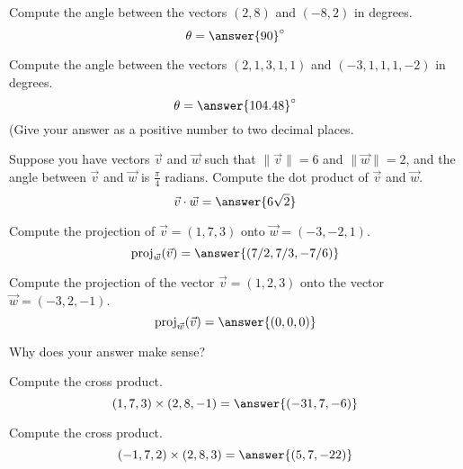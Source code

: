 \documentclass{ximera}
\begin{document}
\begin{problem}
Compute the angle between the vectors $(2,8)$ and $(-8,2)$ in degrees.
\[
\theta = \answer{90}^\circ
\]
\end{problem}

\begin{problem}
Compute the angle between the vectors $(2,1,3,1,1)$ and $(-3,1,1,1,-2)$ in degrees.
\[
\theta = \answer{104.48}^\circ
\]
(Give your answer as a positive number to two decimal places.
\end{problem}

\begin{problem}
Suppose you have vectors $\vec{v}$ and $\vec{w}$ such that $\|\vec{v}\|=6$ and $\|\vec{w}\|=2$, and the angle between $\vec{v}$ and $\vec{w}$ is $\frac{\pi}{4}$ radians. Compute the dot product of $\vec{v}$ and $\vec{w}$.
\[
\vec{v}\cdot \vec{w} = \answer{6\sqrt{2}}
\]
\end{problem}

\begin{problem}
Compute the projection of $\vec{v}=(1,7,3)$ onto $\vec{w}=(-3,-2,1)$.
\[
\textrm{proj}_{\vec{w}}(\vec{v}) = \answer{(7/2,7/3,-7/6)}
\]
\end{problem}

\begin{problem}
Compute the projection of the vector $\vec{v}=(1,2,3)$ onto the vector $\vec{w} = (-3,2,-1)$.
\[
\textrm{proj}_{\vec{w}}(\vec{v}) = \answer{(0,0,0)}
\]
\begin{problem}
Why does your answer make sense?
\begin{multipleChoice}
\end{multipleChoice}
\end{problem}
\end{problem}

\begin{problem}
Compute the cross product.
\[
(1,7,3)\times (2,8,-1) = \answer{(-31,7,-6)}
\]
\end{problem}

\begin{problem}
Compute the cross product.
\[
(-1,7,2)\times(2,8,3) = \answer{(5,7,-22)}
\]
\end{problem}
\end{document}
